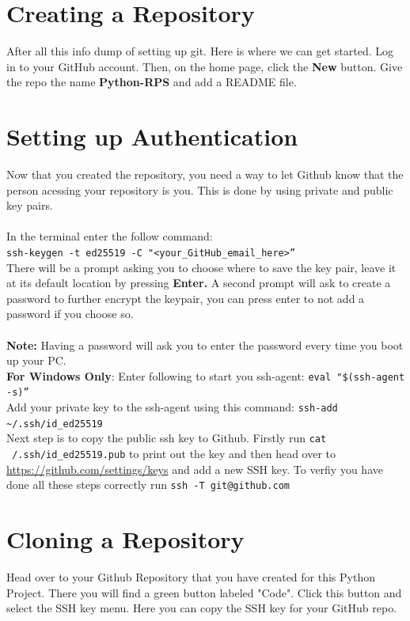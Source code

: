\documentclass[12pt, a4paper]{article}
\begin{document}
\section{Creating a Repository}
After all this info dump of setting up git. Here is where we can get started. Log in to your GitHub account. Then, on the home page, click the \textbf{New} button. Give the repo the name \textbf{Python-RPS} and add a README file.
\section{Setting up Authentication}
Now that you created the repository, you need a way to let Github know that the person acessing your repository is you. This is done by using private and public key pairs. \\\\
In the terminal enter the follow command:\\
\texttt{ssh-keygen -t ed25519 -C "<your\_GitHub\_email\_here>”}\\

\noindent There will be a prompt asking you to choose where to save the key pair, leave it at its default location by pressing \textbf{Enter.} A second prompt will ask to create a password to further encrypt the keypair, you can press enter to not add a password if you choose so.\\\\
\textbf{Note:} Having a password will ask you to enter the password every time you boot up your PC. \\

\noindent\textbf{For Windows Only}: Enter following to start you ssh-agent: \texttt{eval "\$(ssh-agent -s)”}\\

\noindent Add your private key to the ssh-agent using this command:
\verb+ssh-add ~/.ssh/id_ed25519+\\

\noindent Next step is to copy the public ssh key to Github. Firstly run \texttt{cat ~/.ssh/id\_ed25519.pub} to print out the key and then head over to \url{https://github.com/settings/keys} and add a new SSH key. To verfiy you have done all these steps correctly run \texttt{ssh -T git@github.com} 

\section{Cloning a Repository}
Head over to your Github Repository that you have created for this Python Project. There you will find a green button labeled "Code". Click this button and select the SSH key menu. Here you can copy the SSH key for your GitHub repo. \\
\end{document}
